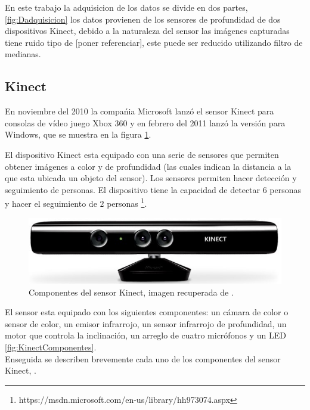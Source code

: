 En este trabajo la adquisicion de los datos se divide en dos partes, \ref{fig:Dadquisicion} los datos provienen de los sensores de profundidad de dos dispositivos Kinect, debido a la naturaleza del sensor las imágenes capturadas tiene ruido tipo de [poner referenciar], este puede ser reducido utilizando filtro de medianas. 


\subsection{Kinect}

En noviembre del 2010 la compa\'nia Microsoft lanz\'o el sensor Kinect para consolas de vídeo juego Xbox 360 y en febrero del 2011 lanz\'o la versi\'on para Windows, que se muestra en la figura \ref{fig:KinectPic}.   

El dispositivo Kinect esta equipado con una serie de sensores que permiten obtener imágenes a color y de profundidad (las cuales indican la distancia a la que esta ubicada un objeto del sensor). Los sensores permiten hacer detección y seguimiento de personas. El dispositivo tiene la capacidad de detectar $6$ personas y hacer el seguimiento de $2$ personas \footnote{https://msdn.microsoft.com/en-us/library/hh973074.aspx}.    
  
\begin{figure}[h!]
\begin{center}
\includegraphics[scale=.65]{./Figures/Kinect.jpg}
\end{center}
\caption{Componentes del sensor Kinect, imagen recuperada de \footnotemark{}.} 
\label{fig:KinectPic}
\end{figure} 


El sensor esta equipado con los siguientes componentes: un cámara de color o sensor de color, un emisor infrarrojo, un sensor infrarrojo de profundidad, un motor que controla la inclinación, un arreglo de cuatro micrófonos y un LED \ref{fig:KinectComponentes}. \\
Enseguida se describen brevemente cada uno de los componentes del sensor Kinect, \citep{Jana2013}. 

